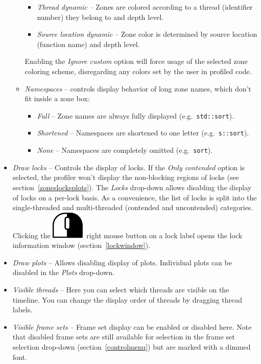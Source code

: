 \documentclass[hidelinks,titlepage,a4paper]{article}
\newcommand{\RMB}{\includegraphics[height=.8\baselineskip]{icons/rmb}}
\begin{document}
\begin{itemize}
\begin{itemize}
\begin{itemize}
\item \emph{Thread dynamic} -- Zones are colored according to a thread (identifier number) they belong to and depth level.
\item \emph{Source location dynamic} -- Zone color is determined by source location (function name) and depth level.
\end{itemize}
Enabling the \emph{Ignore custom} option will force usage of the selected zone coloring scheme, disregarding any colors set by the user in profiled code.
\item \emph{\faBoxOpen{} Namespaces} -- controls display behavior of long zone names, which don't fit inside a zone box:
\begin{itemize}
\item \emph{Full} -- Zone names are always fully displayed (e.g.\ \texttt{std::sort}).
\item \emph{Shortened} -- Namespaces are shortened to one letter (e.g.\ \texttt{s::sort}).
\item \emph{None} -- Namespaces are completely omitted (e.g.\ \texttt{sort}).
\end{itemize}
\end{itemize}
\item \emph{\faLock{} Draw locks} -- Controls the display of locks. If the \emph{Only contended} option is selected, the profiler won't display the non-blocking regions of locks (see section~\ref{zoneslocksplots}). The \emph{Locks} drop-down allows disabling the display of locks on a per-lock basis. As a convenience, the list of locks is split into the single-threaded and multi-threaded (contended and uncontended) categories. Clicking the \RMB{}~right mouse button on a lock label opens the lock information window (section~\ref{lockwindow}).
\item \emph{\faSignature{} Draw plots} -- Allows disabling display of plots. Individual plots can be disabled in the \emph{Plots} drop-down.
\item \emph{\faRandom{} Visible threads} -- Here you can select which threads are visible on the timeline. You can change the display order of threads by dragging thread labels.
\item \emph{\faImages{} Visible frame sets} -- Frame set display can be enabled or disabled here. Note that disabled frame sets are still available for selection in the frame set selection drop-down (section~\ref{controlmenu}) but are marked with a dimmed font.
\end{itemize}
\end{document}
